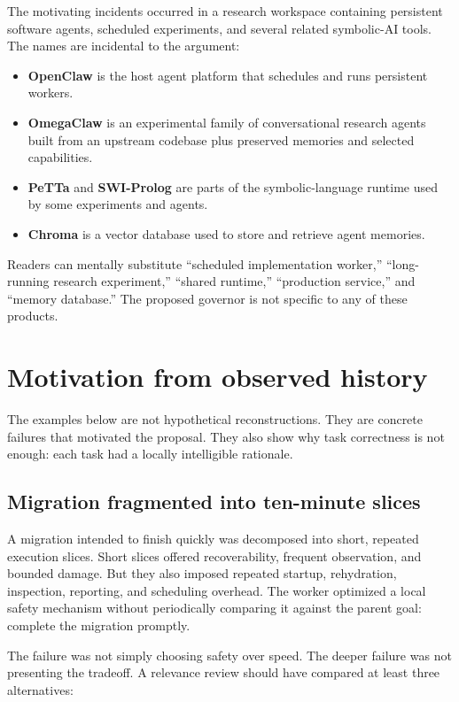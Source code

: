 \documentclass[11pt,letterpaper]{article}
\newcommand{\term}[1]{\textbf{#1}}
\begin{document}
The motivating incidents occurred in a research workspace containing
persistent software agents, scheduled experiments, and several related
symbolic-AI tools. The names are incidental to the argument:

\begin{itemize}
  \item \term{OpenClaw} is the host agent platform that schedules and runs
        persistent workers.
  \item \term{OmegaClaw} is an experimental family of conversational research
        agents built from an upstream codebase plus preserved memories and
        selected capabilities.
  \item \term{PeTTa} and \term{SWI-Prolog} are parts of the symbolic-language
        runtime used by some experiments and agents.
  \item \term{Chroma} is a vector database used to store and retrieve agent
        memories.
\end{itemize}

Readers can mentally substitute ``scheduled implementation worker,''
``long-running research experiment,'' ``shared runtime,'' ``production
service,'' and ``memory database.'' The proposed governor is not specific to
any of these products.

\section{Motivation from observed history}

The examples below are not hypothetical reconstructions. They are concrete
failures that motivated the proposal. They also show why task correctness is
not enough: each task had a locally intelligible rationale.

\subsection{Migration fragmented into ten-minute slices}

A migration intended to finish quickly was decomposed into short, repeated
execution slices. Short slices offered recoverability, frequent observation,
and bounded damage. But they also imposed repeated startup, rehydration,
inspection, reporting, and scheduling overhead. The worker optimized a local
safety mechanism without periodically comparing it against the parent goal:
complete the migration promptly.

The failure was not simply choosing safety over speed. The deeper failure was
not presenting the tradeoff. A relevance review should have compared at least
three alternatives:
\end{document}

